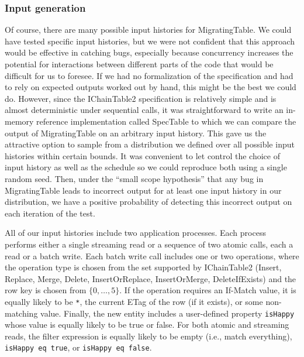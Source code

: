 \subsubsection{Input generation}
\label{sec:mtable:input}

Of course, there are many possible input histories for MigratingTable.  We could have tested specific input histories, but we were not confident that this approach would be effective in catching bugs, especially because concurrency increases the potential for interactions between different parts of the code that would be difficult for us to foresee.  If we had no formalization of the specification and had to rely on expected outputs worked out by hand, this might be the best we could do.  However, since the IChainTable2 specification is relatively simple and is almost deterministic under sequential calls, it was straightforward to write an in-memory reference implementation called SpecTable to which we can compare the output of MigratingTable on an arbitrary input history.  This gave us the attractive option to sample from a distribution we defined over all possible input histories within certain bounds.  It was convenient to let \psharp control the choice of input history as well as the schedule so we could reproduce both using a single random seed.  Then, under the ``small scope hypothesis'' that any bug in MigratingTable leads to incorrect output for at least one input history in our distribution, we have a positive probability of detecting this incorrect output on each iteration of the \psharp test.

All of our input histories include two application processes.  Each process performs either a single streaming read or a sequence of two atomic calls, each a read or a batch write.  Each batch write call includes one or two operations, where the operation type is chosen from the set supported by IChainTable2 (Insert, Replace, Merge, Delete, InsertOrReplace, InsertOrMerge, DeleteIfExists) and the row key is chosen from $\{0, \ldots, 5\}$.  If the operation requires an If-Match value, it is equally likely to be \texttt{*}, the current ETag of the row (if it exists), or some non-matching value.  Finally, the new entity includes a user-defined property \texttt{isHappy} whose value is equally likely to be true or false.  For both atomic and streaming reads, the filter expression is equally likely to be empty (i.e., match everything), \texttt{isHappy eq true}, or \texttt{isHappy eq false}.

